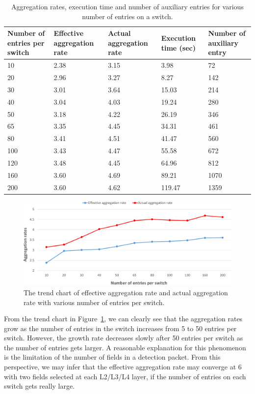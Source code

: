 \begin{table}
\centering
\caption{Aggregation rates, execution time and number of auxiliary entries for various number of entries on a switch.}
\begin{tabular}{|p{1.8cm}|p{2.6cm}|p{2.6cm}|p{1.9cm}|p{2.8cm}|}
\hline Number of entries per switch & Effective aggregation rate & Actual aggregation rate & Execution time (sec) & Number of auxiliary entry \\
\hline
\hline 10 & 2.38 & 3.15 & 3.98 & 72 \\
\hline 20 & 2.96 & 3.27 & 8.27 & 142 \\
\hline 30 & 3.01 & 3.64 & 15.03 & 214 \\
\hline 40 & 3.04 & 4.03 & 19.24 & 280 \\
\hline 50 & 3.18 & 4.22 & 26.19 & 346 \\
\hline 65 & 3.35 & 4.45 & 34.31 & 461 \\
\hline 80 & 3.41 & 4.51 & 41.47 & 560 \\
\hline 100 & 3.43 & 4.47 & 55.58 & 672 \\
\hline 120 & 3.48 & 4.45 & 64.96 & 812 \\
\hline 160 & 3.60 & 4.69 & 89.21 & 1070 \\
\hline 200 & 3.60 & 4.62 & 119.47 & 1359 \\
\hline 
\end{tabular}
\label{table:different_entry_per_switch}
\end{table}

\begin{figure}
\centering
\includegraphics[width=1\textwidth]{figures/exp_entrynum_trend.pdf}
\caption{The trend chart of effective aggregation rate and actual aggregation rate with various number of entries per switch.}
\label{exp_entrynum_trend}
\end{figure}

From the trend chart in Figure~\ref{exp_entrynum_trend}, we can clearly see that the aggregation rates grow as the number of entries in the switch increases from 5 to 50 entries per switch. However, the growth rate decreases slowly after 50 entries per switch as the number of entries gets larger. A reasonable explanation for this phenomenon is the limitation of the number of fields in a detection packet. From this perspective, we may infer that the effective aggregation rate may converge at 6  with two fields selected at each L2/L3/L4 layer, if the number of entries on each switch gets really large.

